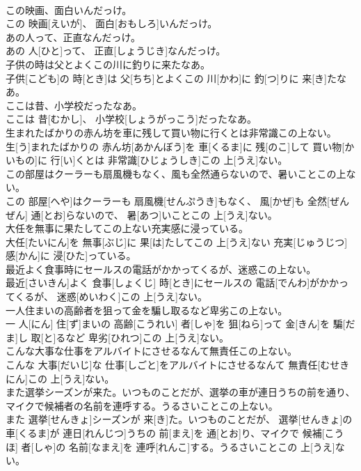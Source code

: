 \documentclass[8pt]{extreport}
\begin{document}
\begin{CJK}{UTF8}{min}
\\	この映画、面白いんだっけ。	
\\	この 映画[えいが]、 面白[おもしろ]いんだっけ。
\\	あの人って、正直なんだっけ。	
\\	あの 人[ひと]って、 正直[しょうじき]なんだっけ。
\\	子供の時は父とよくこの川に釣りに来たなあ。	
\\	子供[こども]の 時[とき]は 父[ちち]とよくこの 川[かわ]に 釣[つ]りに 来[き]たなあ。
\\	ここは昔、小学校だったなあ。	
\\	ここは 昔[むかし]、 小学校[しょうがっこう]だったなあ。
\\	生まれたばかりの赤ん坊を車に残して買い物に行くとは非常識この上ない。	
\\	生[う]まれたばかりの 赤ん坊[あかんぼう]を 車[くるま]に 残[のこ]して 買い物[かいもの]に 行[い]くとは 非常識[ひじょうしき]この 上[うえ]ない。
\\	この部屋はクーラーも扇風機もなく、風も全然通らないので、暑いことこの上ない。	
\\	この 部屋[へや]はクーラーも 扇風機[せんぷうき]もなく、 風[かぜ]も 全然[ぜんぜん] 通[とお]らないので、 暑[あつ]いことこの 上[うえ]ない。
\\	大任を無事に果たしてこの上ない充実感に浸っている。	
\\	大任[たいにん]を 無事[ぶじ]に 果[は]たしてこの 上[うえ]ない 充実[じゅうじつ] 感[かん]に 浸[ひた]っている。
\\	最近よく食事時にセールスの電話がかかってくるが、迷惑この上ない。	
\\	最近[さいきん]よく 食事[しょくじ] 時[とき]にセールスの 電話[でんわ]がかかってくるが、 迷惑[めいわく]この 上[うえ]ない。
\\	一人住まいの高齢者を狙って金を騙し取るなど卑劣この上ない。	
\\	一 人[にん] 住[ず]まいの 高齢[こうれい] 者[しゃ]を 狙[ねら]って 金[きん]を 騙[だま]し 取[と]るなど 卑劣[ひれつ]この 上[うえ]ない。
\\	こんな大事な仕事をアルバイトにさせるなんて無責任この上ない。	
\\	こんな 大事[だいじ]な 仕事[しごと]をアルバイトにさせるなんて 無責任[むせきにん]この 上[うえ]ない。
\\	また選挙シーズンが来た。いつものことだが、選挙の車が連日うちの前を通り、マイクで候補者の名前を連呼する。うるさいことこの上ない。	
\\	また 選挙[せんきょ]シーズンが 来[き]た。いつものことだが、 選挙[せんきょ]の 車[くるま]が 連日[れんじつ]うちの 前[まえ]を 通[とお]り、マイクで 候補[こうほ] 者[しゃ]の 名前[なまえ]を 連呼[れんこ]する。うるさいことこの 上[うえ]ない。

\end{CJK}
\end{document}
